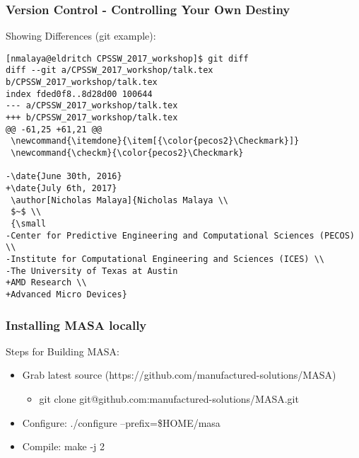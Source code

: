 \documentclass[mathserif]{beamer}
\newcommand{\itemdone}{\item[{\color{pecos2}\Checkmark}]}
\newcommand{\checkm}{\color{pecos2}\Checkmark}
\begin{document}
%
%
\begin{frame}[fragile]
\frametitle{Version Control - Controlling Your Own Destiny}

\begin{block}{Showing Differences (git example):}
\begin{scriptsize}
\begin{verbatim}
[nmalaya@eldritch CPSSW_2017_workshop]$ git diff
diff --git a/CPSSW_2017_workshop/talk.tex b/CPSSW_2017_workshop/talk.tex
index fded0f8..8d28d00 100644
--- a/CPSSW_2017_workshop/talk.tex
+++ b/CPSSW_2017_workshop/talk.tex
@@ -61,25 +61,21 @@
 \newcommand{\itemdone}{\item[{\color{pecos2}\Checkmark}]}
 \newcommand{\checkm}{\color{pecos2}\Checkmark}
 
-\date{June 30th, 2016}
+\date{July 6th, 2017}
 \author[Nicholas Malaya]{Nicholas Malaya \\
 $~$ \\
 {\small
-Center for Predictive Engineering and Computational Sciences (PECOS) \\
-Institute for Computational Engineering and Sciences (ICES) \\
-The University of Texas at Austin
+AMD Research \\
+Advanced Micro Devices}
\end{verbatim}
\end{scriptsize}
\end{block}
\end{frame}

\begin{frame}
  \frametitle{Installing MASA locally}
  \begin{block}{Steps for Building MASA:}
    \begin{itemize}
      \item Grab latest source (https://github.com/manufactured-solutions/MASA)
	    \begin{itemize}
	     \item git clone git@github.com:manufactured-solutions/MASA.git
	    \end{itemize}
      \item Configure: ./configure --prefix=\$HOME/masa %
      \item Compile: make -j 2
     \end{itemize}
   \end{block}

\begin{center}
\small
{}
\end{center}

\end{frame}
\end{document}
